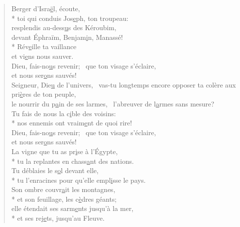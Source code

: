 
\begin{verse}
Berger d’Isra\underline{ë}l, écoute, \\*
toi qui conduis Jos\underline{e}ph, ton troupeau: \\
resplendis au-dess\underline{u}s des Kéroubim, \\
devant Éphraïm, Benjam\underline{i}n, Manassé! \\*
Rév\underline{e}ille ta vaillance \\
et vi\underline{e}ns nous sauver. \\

Dieu, fais-no\underline{u}s revenir;~\psalmstar
que ton visage s’éclaire, \\
et nous ser\underline{o}ns sauvés! \\

Seigneur, Die\underline{u} de l’univers,~\psalmstar
vas-tu longtemps encore
opposer ta colère aux pri\underline{è}res de ton peuple, \\
le nourrir du p\underline{a}in de ses larmes,~\psalmstar
l’abreuver de l\underline{a}rmes sans mesure? \\
Tu fais de nous la c\underline{i}ble des voisins: \\*
nos ennemis ont vraim\underline{e}nt de quoi rire! \\

Dieu, fais-no\underline{u}s revenir;~\psalmstar
que ton visage s’éclaire, \\
et nous ser\underline{o}ns sauvés! \\

La vigne que tu as pr\underline{i}se à l’Égypte, \\*
tu la replantes en chass\underline{a}nt des nations. \\
Tu déblaies le s\underline{o}l devant elle, \\*
tu l’enracines pour qu’elle empl\underline{i}sse le pays. \\

Son ombre couvr\underline{a}it les montagnes, \\*
et son feuillage, les c\underline{è}dres géants; \\
elle étendait ses sarm\underline{e}nts jusqu’à la mer, \\*
et ses rej\underline{e}ts, jusqu’au Fleuve. \\


\end{verse}
